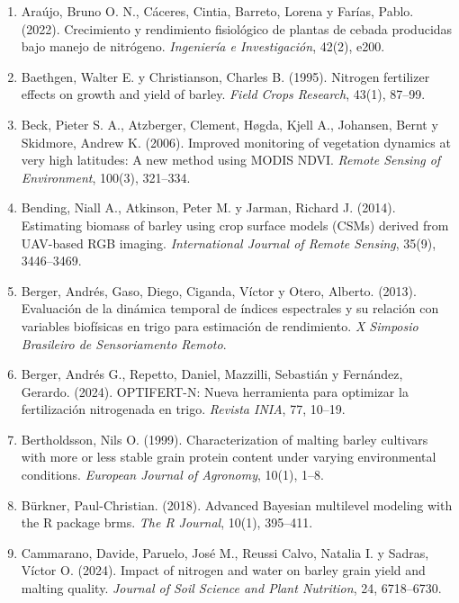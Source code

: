 \documentclass[
11pt, %
]{charter}
\begin{document}
\begin{enumerate}
    \item Araújo, Bruno O. N., Cáceres, Cintia, Barreto, Lorena y Farías, Pablo. (2022). Crecimiento y rendimiento fisiológico de plantas de cebada producidas bajo manejo de nitrógeno. \emph{Ingeniería e Investigación}, 42(2), e200.

    \item Baethgen, Walter E. y Christianson, Charles B. (1995). Nitrogen fertilizer effects on growth and yield of barley. \emph{Field Crops Research}, 43(1), 87–99.

    \item Beck, Pieter S. A., Atzberger, Clement, Høgda, Kjell A., Johansen, Bernt y Skidmore, Andrew K. (2006). Improved monitoring of vegetation dynamics at very high latitudes: A new method using MODIS NDVI. \emph{Remote Sensing of Environment}, 100(3), 321–334.

    \item Bending, Niall A., Atkinson, Peter M. y Jarman, Richard J. (2014). Estimating biomass of barley using crop surface models (CSMs) derived from UAV-based RGB imaging. \emph{International Journal of Remote Sensing}, 35(9), 3446–3469.

    \item Berger, Andrés, Gaso, Diego, Ciganda, Víctor y Otero, Alberto. (2013). Evaluación de la dinámica temporal de índices espectrales y su relación con variables biofísicas en trigo para estimación de rendimiento. \emph{X Simposio Brasileiro de Sensoriamento Remoto}.

    \item Berger, Andrés G., Repetto, Daniel, Mazzilli, Sebastián y Fernández, Gerardo. (2024). OPTIFERT-N: Nueva herramienta para optimizar la fertilización nitrogenada en trigo. \emph{Revista INIA}, 77, 10–19.

    \item Bertholdsson, Nils O. (1999). Characterization of malting barley cultivars with more or less stable grain protein content under varying environmental conditions. \emph{European Journal of Agronomy}, 10(1), 1–8.

    \item Bürkner, Paul-Christian. (2018). Advanced Bayesian multilevel modeling with the R package brms. \emph{The R Journal}, 10(1), 395–411.

    \item Cammarano, Davide, Paruelo, José M., Reussi Calvo, Natalia I. y Sadras, Víctor O. (2024). Impact of nitrogen and water on barley grain yield and malting quality. \emph{Journal of Soil Science and Plant Nutrition}, 24, 6718–6730.


\end{enumerate}
\end{document}
